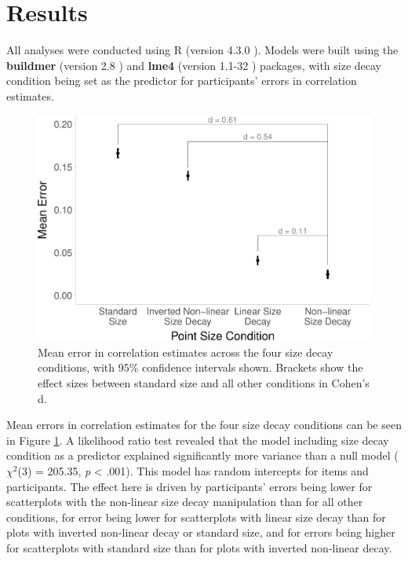 \documentclass{vgtc}                          %
\begin{document}
\hypertarget{results}{%
\section{Results}\label{results}}

All analyses were conducted using R (version 4.3.0 \cite{r_core}). Models were
built using the \textbf{buildmer} (version 2.8 \cite{voeten_buildmer}) and \textbf{lme4}
(version 1.1-32 \cite{bates_lme4_2015}) packages, with size decay condition being set
as the predictor for participants' errors in correlation estimates.

\begin{figure}
\includegraphics[width=1\linewidth]{size_and_scatterplots_files/figure-latex/dot-plot-1} \caption{Mean error in correlation estimates across the four size decay conditions, with 95\% confidence intervals shown. Brackets show the effect sizes between standard size and all other conditions in Cohen's d.}\label{fig:dot-plot}
\end{figure}

Mean errors in correlation estimates for the four size decay conditions
can be seen in Figure \ref{fig:dot-plot}. A likelihood ratio test revealed that the
model including size decay condition as a predictor explained significantly more
variance than a null model (\(\chi^2\)(3) = 205.35,
\emph{p} \textless{} .001). This model has random intercepts for
items and participants. The effect here is driven by participants' errors being lower
for scatterplots with the non-linear size decay manipulation than for all other conditions,
for error being lower for scatterplots with linear size decay than for plots with
inverted non-linear decay or standard size, and for errors being higher for scatterplots
with standard size than for plots with inverted non-linear decay.
\end{document}
